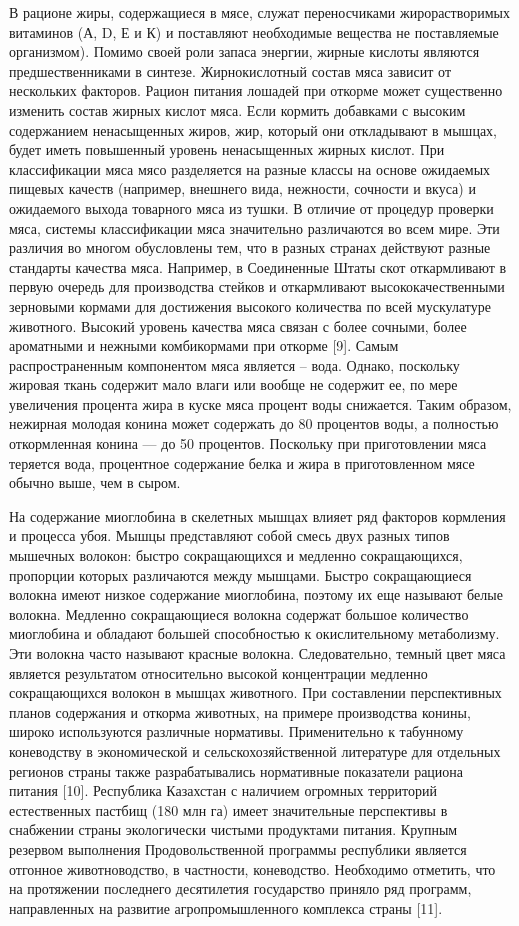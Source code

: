 \begin{multicols}{2}
В рационе жиры, содержащиеся в мясе, служат переносчиками
жирорастворимых витаминов (А, D, Е и К) и поставляют необходимые
вещества не поставляемые организмом). Помимо своей роли запаса энергии,
жирные кислоты являются предшественниками в синтезе. Жирнокислотный
состав мяса зависит от нескольких факторов. Рацион питания лошадей при
откорме может существенно изменить состав жирных кислот мяса. Если
кормить добавками с высоким содержанием ненасыщенных жиров, жир, который
они откладывают в мышцах, будет иметь повышенный уровень ненасыщенных
жирных кислот. При классификации мяса мясо разделяется на разные классы
на основе ожидаемых пищевых качеств (например, внешнего вида, нежности,
сочности и вкуса) и ожидаемого выхода товарного мяса из тушки. В отличие
от процедур проверки мяса, системы классификации мяса значительно
различаются во всем мире. Эти различия во многом обусловлены тем, что в
разных странах действуют разные стандарты качества мяса. Например, в
Соединенные Штаты скот откармливают в первую очередь для производства
стейков и откармливают высококачественными зерновыми кормами для
достижения высокого количества по всей мускулатуре животного. Высокий
уровень качества мяса связан с более сочными, более ароматными и нежными
комбикормами при откорме {[}9{]}. Самым распространенным компонентом
мяса является -- вода. Однако, поскольку жировая ткань содержит мало
влаги или вообще не содержит ее, по мере увеличения процента жира в
куске мяса процент воды снижается. Таким образом, нежирная молодая
конина может содержать до 80 процентов воды, а полностью откормленная
конина --- до 50 процентов. Поскольку при приготовлении мяса теряется
вода, процентное содержание белка и жира в приготовленном мясе обычно
выше, чем в сыром.

На содержание миоглобина в скелетных мышцах влияет ряд факторов
кормления и процесса убоя. Мышцы представляют собой смесь двух разных
типов мышечных волокон: быстро сокращающихся и медленно сокращающихся,
пропорции которых различаются между мышцами. Быстро сокращающиеся
волокна имеют низкое содержание миоглобина, поэтому их еще называют
белые волокна. Медленно сокращающиеся волокна содержат большое
количество миоглобина и обладают большей способностью к окислительному
метаболизму. Эти волокна часто называют красные волокна. Следовательно,
темный цвет мяса является результатом относительно высокой концентрации
медленно сокращающихся волокон в мышцах животного. При составлении
перспективных планов содержания и откорма животных, на примере
производства конины, широко используются различные нормативы.
Применительно к табунному коневодству в экономической и
сельскохозяйственной литературе для отдельных регионов страны также
разрабатывались нормативные показатели рациона питания {[}10{]}.
Республика Казахстан с наличием огромных территорий естественных пастбищ
(180 млн га) имеет значительные перспективы в снабжении страны
экологически чистыми продуктами питания. Крупным резервом выполнения
Продовольственной программы республики является отгонное животноводство,
в частности, коневодство. Необходимо отметить, что на протяжении
последнего десятилетия государство приняло ряд программ, направленных на
развитие агропромышленного комплекса страны {[}11{]}.


\end{multicols}
